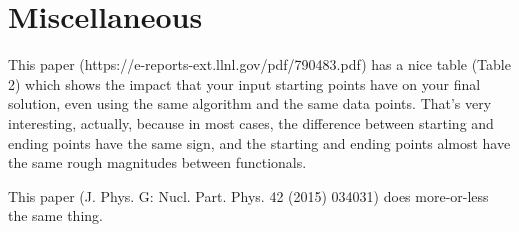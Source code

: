 \section{Miscellaneous}

This paper (https://e-reports-ext.llnl.gov/pdf/790483.pdf) has a nice table (Table 2) which shows the impact that your input starting points have on your final solution, even using the same algorithm and the same data points. That's very interesting, actually, because in most cases, the difference between starting and ending points have the same sign, and the starting and ending points almost have the same rough magnitudes between functionals.

This paper (J. Phys. G: Nucl. Part. Phys. 42 (2015) 034031) does more-or-less the same thing.

